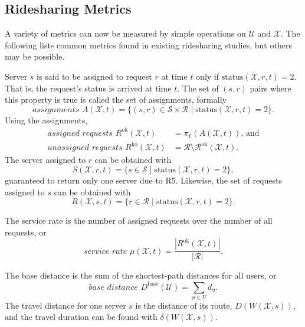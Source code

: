 \subsection{Ridesharing Metrics}
\label{ch:1:sec:ridesharing-metrics}
A variety of metrics can now be measured by simple operations on $\mathcal{U}$
and $\mathcal{X}$.  The following lists common metrics found in existing
ridesharing studies, but others may be possible.

Server $s$ is said to be assigned to request $r$ at time $t$ only if
$\textrm{status}(\mathcal{X},r,t)=2$. That is, the request's status is arrived at time $t$.
The set of $(s,r)$ pairs
where this property is true is called the set of assignments, formally
\begin{equation}
\label{eq:assignments}
\textit{assignments }A(\mathcal{X},t)=
\{(s,r)\in\mathcal{S}\times \mathcal{R} \mid \textrm{status}(\mathcal{X},r,t)=2\}.
\end{equation}
Using the assignments,
\begin{align}
\label{eq:assigned-requests}
\textit{assigned requests }R^\textrm{ok}(\mathcal{X},t)&=\pi_\texttt{r}(A(\mathcal{X},t))\textrm{, and}\\
\label{eq:unassigned-requests}
\textit{unassigned requests }R^\textrm{ko}(\mathcal{X},t)&=\mathcal{R}\setminus\mathcal{R}^\textrm{ok}(\mathcal{X},t).
\end{align}
The server assigned to $r$ can be obtained with
\begin{equation}
S(\mathcal{X},r,t)=\{s\in\mathcal{S}\mid\textrm{status}(\mathcal{X},r,t)=2\},
\end{equation}
guaranteed to return only one server due to R5.
Likewise, the set of requests assigned to $s$ can be obtained with
\begin{equation}
\label{eq:R(X,s,t)}
R(\mathcal{X},s,t)=\{r\in\mathcal{R}\mid\textrm{status}(\mathcal{X},r,t)=2\}.
\end{equation}

The service rate is the number of assigned requests over the number of all requests, or
\begin{equation}
\label{eq:service-rate}
\textit{service rate }\mu(\mathcal{X},t)=\frac{|R^\textrm{ok}(\mathcal{X},t)|}{|\mathcal{R}|}.
\end{equation}

The base distance is the sum of the shortest-path distances for all users, or
\begin{equation}
\label{eq:base-distance}
\textit{base distance }D^\textrm{base}(\mathcal{U})=\sum_{u\in U}d_u.
\end{equation}
The travel distance for one server $s$ is the distance of its route,
$D(W(\mathcal{X},s))$,
and the travel duration can be found with
$\delta(W(\mathcal{X},s))$.


